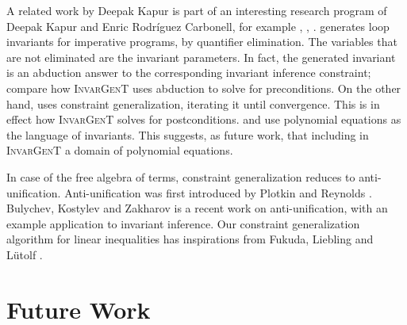 \documentclass{article}
\newcommand{\tmname}[1]{\textsc{#1}}
\begin{document}
A related work by Deepak Kapur {\cite{LoopQuantElim}} is part of an
interesting research program of Deepak Kapur and Enric Rodr{\'i}guez
Carbonell, for example {\cite{LoopQuantElim}}, {\cite{RodriKapurICTAC04}},
{\cite{RodriKapurJSC07}}. {\cite{LoopQuantElim}} generates loop invariants for
imperative programs, by quantifier elimination. The variables that are not
eliminated are the invariant parameters. In fact, the generated invariant is
an abduction answer to the corresponding invariant inference constraint;
compare how {\tmname{InvarGenT}} uses abduction to solve for preconditions. On
the other hand, {\cite{RodriKapurICTAC04}} uses constraint generalization,
iterating it until convergence. This is in effect how {\tmname{InvarGenT}}
solves for postconditions. {\cite{RodriKapurICTAC04}} and
{\cite{RodriKapurJSC07}} use polynomial equations as the language of
invariants. This suggests, as future work, that including in
{\tmname{InvarGenT}} a domain of polynomial equations.

In case of the free algebra of terms, constraint generalization reduces to
anti-unification. Anti-unification was first introduced by Plotkin
{\cite{AntiUnifPlotkin}} and Reynolds {\cite{AntiUnifReynolds}}. Bulychev,
Kostylev and Zakharov {\cite{AntiUnifInv}} is a recent work on
anti-unification, with an example application to invariant inference. Our
constraint generalization algorithm for linear inequalities has inspirations
from Fukuda, Liebling  and  L{\"u}tolf {\cite{ConvexHull}}.

\section{Future Work}\label{SecFutWork}
\end{document}
